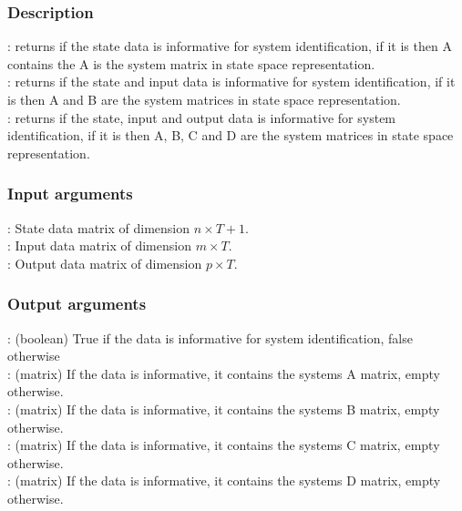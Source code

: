 \subsubsection*{Description}
: returns if the state data is informative for system identification, if it is then A contains the A is the system matrix in state space representation.\\
: returns if the state and input data is informative for system identification, if it is then A and B are the system matrices in state space representation.\\
: returns if the state, input and output data is informative for system identification, if it is then A, B, C and D are the system matrices in state space representation.

\subsubsection*{Input arguments}
\textbf{}: State data matrix of dimension $n \times T+1$.\\
\textbf{}: Input data matrix of dimension $m \times T$.\\
\textbf{}: Output data matrix of dimension $p \times T$.

\subsubsection*{Output arguments}
\textbf{}: (boolean) True if the data is informative for system identification, false otherwise\\
\textbf{}: (matrix) If the data is informative, it contains the systems A matrix, empty otherwise.\\
\textbf{}: (matrix) If the data is informative, it contains the systems B matrix, empty otherwise.\\
\textbf{}: (matrix) If the data is informative, it contains the systems C matrix, empty otherwise.\\
\textbf{}: (matrix) If the data is informative, it contains the systems D matrix, empty otherwise.


